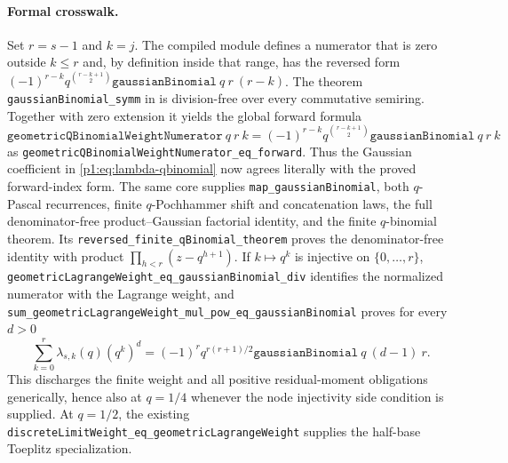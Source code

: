 \documentclass[11pt]{article}
\numberwithin{equation}{section}
\theoremstyle{definition}
\theoremstyle{remark}
\begin{document}
\paragraph{Formal crosswalk.}
Set \(r=s-1\) and \(k=j\).  The compiled module
 defines a numerator that is zero
outside \(k\le r\) and, by definition inside that range, has the reversed
form
\( (-1)^{r-k}q^{\binom{r-k+1}{2}}
\texttt{gaussianBinomial}\ q\ r\ (r-k)\).
The theorem \nolinkurl{gaussianBinomial_symm} in
 is division-free over every commutative
semiring.  Together with zero extension it yields the global forward formula
\[
 \texttt{geometricQBinomialWeightNumerator}\ q\ r\ k
 =(-1)^{r-k}q^{\binom{r-k+1}{2}}
   \texttt{gaussianBinomial}\ q\ r\ k
\]
as \nolinkurl{geometricQBinomialWeightNumerator_eq_forward}.  Thus the
Gaussian coefficient in \eqref{p1:eq:lambda-qbinomial} now agrees literally
with the proved forward-index form.  The same core supplies
\nolinkurl{map_gaussianBinomial}, both \(q\)-Pascal recurrences, finite
\(q\)-Pochhammer shift and concatenation laws, the full denominator-free
product--Gaussian factorial identity, and the finite \(q\)-binomial theorem.
Its \nolinkurl{reversed_finite_qBinomial_theorem} proves the
denominator-free identity with product
\(\prod_{h<r}(z-q^{h+1})\).  If \(k\mapsto q^k\) is injective on
\(\{0,\ldots,r\}\),
\nolinkurl{geometricLagrangeWeight_eq_gaussianBinomial_div} identifies
the normalized numerator with the Lagrange weight, and
\nolinkurl{sum_geometricLagrangeWeight_mul_pow_eq_gaussianBinomial}
proves for every \(d>0\)
\[
 \sum_{k=0}^{r}\lambda_{s,k}(q)(q^k)^d
 =(-1)^r q^{r(r+1)/2}
   \texttt{gaussianBinomial}\ q\ (d-1)\ r.
\]
This discharges the finite weight and all positive residual-moment
obligations generically, hence also at \(q=1/4\) whenever the node
injectivity side condition is supplied.  At \(q=1/2\), the existing
\texttt{discreteLimitWeight\_eq\_geometricLagrangeWeight} supplies the
half-base Toeplitz specialization.
\end{document}
